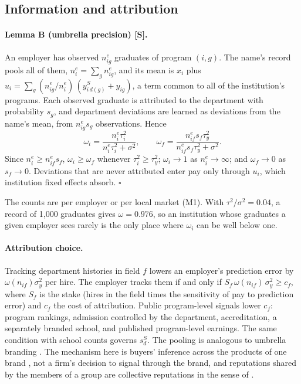 \documentclass[11pt]{article}
\begin{document}
\subsection{Information and attribution}\label{si:theory:attrib}

\paragraph{Lemma B (umbrella precision) [S].} An employer has observed $n^e_{ig}$ graduates of program $(i,g)$.
The name's record pools all of them, $n^e_i=\sum_gn^e_{ig}$, and its mean is $x_i$ plus
$u_i=\sum_g(n^e_{ig}/n^e_i)\,(y^S_{i\,d(g)}+y_{ig})$, a term common to all of the institution's programs. Each
observed graduate is attributed to the department with probability $s_g$, and department deviations are learned
as deviations from the name's mean, from $n^e_{ig}s_g$ observations. Hence
\[
\omega_i=\frac{n^e_i\tau_i^2}{n^e_i\tau_i^2+\sigma^2},\qquad
\omega_f=\frac{n^e_{if}s_f\tau_y^2}{n^e_{if}s_f\tau_y^2+\sigma^2}.
\]
Since $n^e_i\ge n^e_{if}s_f$, $\omega_i\ge\omega_f$ whenever $\tau_i^2\ge\tau_y^2$; $\omega_i\to1$ as
$n^e_i\to\infty$; and $\omega_f\to0$ as $s_f\to0$. Deviations that are never attributed enter pay only through
$u_i$, which institution fixed effects absorb. $\square$

The counts are per employer or per local market (M1). With $\tau^2/\sigma^2=0.04$, a record of 1,000 graduates
gives $\omega=0.976$, so an institution whose graduates a given employer sees rarely is the only place where
$\omega_i$ can be well below one.

\paragraph{Attribution choice.} Tracking department histories in field $f$ lowers an employer's prediction error
by $\omega(n_{if})\sigma_y^2$ per hire. The employer tracks them if and only if
$S_f\,\omega(n_{if})\,\sigma_y^2\ge c_f$, where $S_f$ is the stake (hires in the field times the sensitivity of pay
to prediction error) and $c_f$ the cost of attribution. Public program-level signals lower $c_f$: program
rankings, admission controlled by the department, accreditation, a separately branded school, and published
program-level earnings. The same condition with school counts governs $s^S_d$. The pooling is analogous to
umbrella branding \citep{wernerfelt1988umbrella}. The mechanism here is buyers' inference across the products of
one brand \citep{choi1998brand,cabral2000stretching}, not a firm's decision to signal through the brand, and
reputations shared by the members of a group are collective reputations in the sense of \citet{tirole1996theory}.
\end{document}
